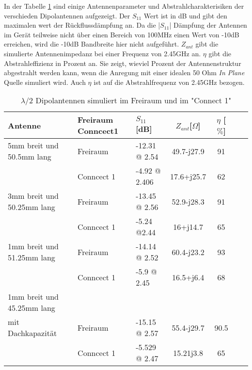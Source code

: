In der Tabelle \ref{tab:Vergeich_Lambda/2_Freiraum_Geraet} sind einige Antennenparameter und Abstrahlcharakterisiken der verschieden Dipolantennen aufgezeigt. Der $S_{11}$ Wert ist in dB und gibt den maximalen wert der Rückflussdämpfung an. Da die |$S_{11}$| Dämpfung der Antennen im Gerät teilweise nicht über einen Bereich von 100MHz einen  Wert von -10dB erreichen, wird die -10dB Bandbreite hier nicht aufgeführt.
$Z_{ant}$ gibt die simulierte Antennenimpedanz bei einer Frequenz von 2.45GHz an.
$\eta$ gibt die Abstrahleffizienz in Prozent an. Sie zeigt, wieviel Prozent der Antennenstruktur abgestrahlt werden kann, wenn die Anregung mit einer idealen 50 Ohm \textit{In Plane} Quelle simuliert wird. Auch $\eta$ ist auf die Abstrahlfrequenz von 2.45GHz bezogen.

\begin{table}[!ht]
  \centering
  \begin{tabular}{p{4cm} p{2cm} l c c c r} 
  \toprule 
  Antenne                  	& Freiraum Conncect1	 & $S_{11}$[dB]	& $Z_{ant}$[$\Omega$] 	& $\eta$ [$\%$]\\ 
  \midrule
 5mm breit und 50.5mm lang    	& Freiraum			&	-12.31 @ 2.54		&  	49.7-j27.9		&   	91	\\
            					& Conncect 1   			&   -4.92 @ 2.406   		&	17.6+j25.7		& 	62	\\
 3mm breit und 50.25mm lang    & Freiraum			&    -13.45 @ 2.56  		&	52.9-j28.3		&	91	\\
     						& Conncect 1				&  	-5.24 @2.44			&	16+j14.7			&	65	\\
 1mm breit und 51.25mm lang  	& Freiraum			&    -14.14 @ 2.52    	&	60.4-j23.2		&	93	\\
      						& Conncect 1				&  	-5.9 @ 2.45			&	16.5+j6.4		&	68	\\
  1mm breit und 45.25mm lang \\
  mit Dachkapazität  		& Freiraum				&   -15.15 @ 2.57      	&	55.4-j29.7		&	90.5	\\
      						& Conncect 1				&  	-5.529 @ 2.47		&	15.21j3.8		&	65	\\
 \bottomrule
  \end{tabular}
  \caption{$\lambda/2$ Dipolantennen simuliert im Freiraum und im "Connect 1"}
  \label{tab:Vergeich_Lambda/2_Freiraum_Geraet}
\end{table}
%	

